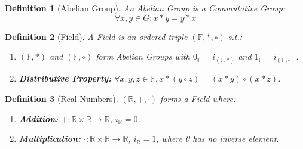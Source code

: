 \documentclass{article}
\newtheorem{definition}{Definition}[section]
\begin{document}
			\begin{definition}[Abelian Group]
			\label{abelian group}
				An Abelian Group is a Commutative Group:
				$$\forall x, y \in G: x * y = y * x$$
			\end{definition}

			\begin{definition}[Field]
			\label{field}
				A Field is an ordered triple $(\mathbb{F}, *, \circ)$ s.t.:
				\begin{enumerate}
					\item $(\mathbb{F}, *)$ and $(\mathbb{F}, \circ)$ form Abelian Groups with $0_\mathbb{F} = i_{(\mathbb{F}, *)}$ and $1_\mathbb{F} = i_{(\mathbb{F}, \circ)}$.
					\item \textbf{Distributive Property:} $\forall x, y, z \in \mathbb{F}, x * (y \circ z) = (x * y) \circ (x * z)$.
				\end{enumerate}
			\end{definition}
			
			\begin{definition}[Real Numbers]
			\label{real numbers}
				$(\mathbb{R}, +, \cdot)$ forms a Field where:
				\begin{enumerate}
					\item \textbf{Addition:} $+\colon \mathbb{R} \times \mathbb{R} \to \mathbb{R}$, $i_\mathbb{R} = 0$. 
					\item \textbf{Multiplication:} $\cdot \colon \mathbb{R} \times \mathbb{R} \to \mathbb{R}$, $i_\mathbb{R} = 1$, where 0 has no inverse element.
				\end{enumerate}
			\end{definition}
\end{document}
